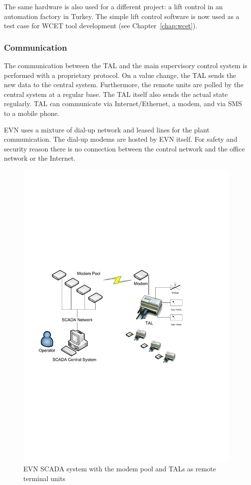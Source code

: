 The same hardware is also used for a different project: a lift
control in an automation factory in Turkey. The simple lift control
software is now used as a test case for WCET tool development (see
Chapter~\ref{chap:wcet}).

\subsubsection{Communication}

The communication between the TAL and the main supervisory control
system is performed with a proprietary protocol. On a value change,
the TAL sends the new data to the central system. Furthermore, the
remote units are polled by the central system at a regular base. The
TAL itself also sends the actual state regularly. TAL can communicate
via Internet/Ethernet, a modem, and via SMS to a mobile phone.

EVN uses a mixture of dial-up network and leased lines for the plant
communication. The dial-up modems are hosted by EVN itself. For
safety and security reason there is no connection between the control
network and the office network or the Internet.

\begin{figure}[t]
    \centering
    \includegraphics[scale=0.75]{results/tal}
    \caption{EVN SCADA system with the modem pool and TALs as remote terminal units}
    \label{fig:tal}
\end{figure}

